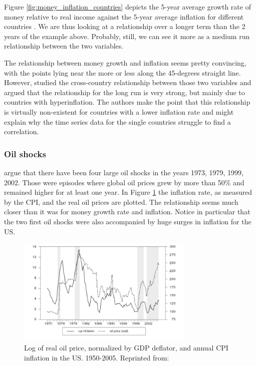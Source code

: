 \documentclass[11pt,a4paper,oneside]{book}
\begin{document}
Figure \ref{fig:money_inflation_countries} depicts the 5-year average growth rate of money relative to real income against the 5-year average inflation for different countries \citet*{Dwyer_Hafer_1999}. We are thus looking at a relationship over a longer term than the 2 years of the example above. Probably, still, we can see it more as a medium run relationship between the two variables.

The relationship between money growth and inflation seems pretty convincing, with the points lying near the more or less along the 45-degrees straight line. However, \citet*{DeGrauwe_Polan_2005} studied the cross-country relationship between those two variables and argued that the relationship for the long run is very strong, but mainly due to countries with hyperinflation. The authors make the point that this relationship is virtually non-existent for countries with a lower inflation rate and might explain why the time series data for the single countries struggle to find a correlation.

\subsubsection{Oil shocks}
\label{subsub:oil_shocks}
\citet{Blanchard_Gali_2010} argue that there have been four large oil shocks in the years 1973, 1979, 1999, 2002. Those were episodes where global oil prices grew by more than 50\% and remained higher for at least one year. In Figure \ref{fig:oil} the inflation rate, as measured by the CPI, and the real oil prices are plotted. The relationship seems much closer than it was for money growth rate and inflation. Notice in particular that the two first oil shocks were also accompanied by huge surges in inflation for the US.

\begin{figure}[h!]
  \centering
    \includegraphics[width=0.75\textwidth]{Oil_shocks_inflation.jpg}
    \caption{Log of real oil price, normalized by GDP deflator, and annual CPI inflation in the US. 1950-2005. Reprinted from: \citet*[p. 12]{Blanchard_Gali_2007}}
    \label{fig:oil}
\end{figure}
\end{document}
